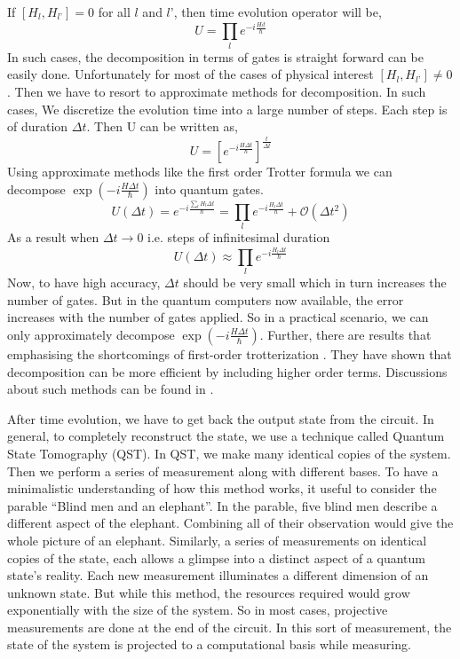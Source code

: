\documentclass[12pt,a4paper]{report}
\begin{document}
If $[ H_{l}, H_{l’}] =0$ for all $l$ and $l’$, then time evolution operator will be,
\begin{equation}
U = \prod_{l} e^{-i\frac{H_{l} t}{\hbar}} 
\end{equation}
In such cases, the decomposition in terms of gates is straight forward can be easily done. Unfortunately for most of the cases of physical interest $[ H_{l}, H_{l’}] \neq 0 $. 
Then we have to resort to approximate methods for decomposition. In such cases, We discretize the evolution time into a large number of steps. Each step is of duration $\Delta t$. Then U can be written as,
\begin{equation}
U = \left[e^{-i\frac{H\Delta t}{\hbar}}\right]^{\frac{t}{\Delta t}}
\end{equation}
Using approximate methods like the first order Trotter formula we can decompose $\exp\left(-i\frac{H\Delta t}{\hbar}\right)$ into quantum gates. 
\begin{equation}
U(\Delta t) = e^{-i\frac{\sum_{l} H_{l}\Delta t}{\hbar}} = \prod_{l} e^{-i\frac{H_{l}\Delta t}{\hbar}}+ \mathcal{O}(\Delta t^{2})
\end{equation}
As a result when $\Delta t \rightarrow 0$ i.e. steps of infinitesimal duration
\begin{equation}
U(\Delta t) \approx \prod_{l} e^{-i\frac{H_{l}\Delta t}{\hbar}}
\end{equation}
Now, to have high accuracy, $\Delta t$ should be very small which in turn increases the number of gates. But in the quantum computers now available, the error increases with the number of gates applied. So in a practical scenario, we can only approximately decompose $\exp\left(-i\frac{H\Delta t}{\hbar}\right)$. Further, there are results that emphasising the shortcomings of first-order trotterization \cite{brown}\cite{clark}.  They have shown that decomposition can be more efficient by including higher order terms. Discussions about such methods can be found in \cite{nielsen}. 

After time evolution, we have to get back the output state from the circuit. In general, to completely reconstruct the state, we use a technique called Quantum State Tomography (QST).  In QST, we make many identical copies of the system. Then we perform a series of measurement along with different bases. To have a minimalistic understanding of how this method works, it useful to consider the parable “Blind men and an elephant”. In the parable, five blind men describe a different aspect of the elephant. Combining all of their observation would give the whole picture of an elephant. Similarly, a series of measurements on identical copies of the state, each allows a glimpse into a distinct aspect of a quantum state’s reality. Each new measurement illuminates a different dimension of an unknown state. But while this method, the resources required would grow exponentially with the size of the system. So in most cases, projective measurements are done at the end of the circuit. In this sort of measurement, the state of the system is projected to a computational basis while measuring. 
\end{document}
